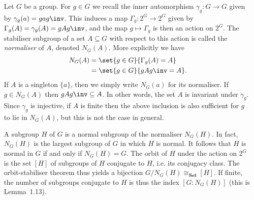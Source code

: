 \documentclass[article, a4paper, 11pt, oneside]{memoir}
\numberwithin{equation}{chapter}
\newcommand{\ncat}[1]{\mathbf{#1}} %
\newcommand{\catSet}{\ncat{Set}} %
\theoremstyle{nonumberplain}
\begin{document}
\begin{remarkbreak}
    Let $G$ be a group. For $g \in G$ we recall the inner automorphism $\gamma_g \colon G \to G$ given by $\gamma_g(a) = gag\inv$. This induces a map $\Gamma_g \colon 2^G \to 2^G$ given by $\Gamma_g(A) = \gamma_g(A) = gAg\inv$, and the map $g \mapsto \Gamma_g$ is then an action on $2^G$. The stabiliser subgroup of a set $A \subseteq G$ with respect to this action is called the \emph{normaliser} of $A$, denoted $N_G(A)$. More explicitly we have
    \begin{align*}
        N_G(A)
            &= \set{g \in G}{\Gamma_g(A) = A} \\
            &= \set{g \in G}{gAg\inv = A}.
    \end{align*}
    If $A$ is a singleton $\{a\}$, then we simply write $N_G(a)$ for its normaliser. If $g \in N_G(A)$ then $gAg\inv \subseteq A$. In other words, the set $A$ is invariant under $\gamma_g$. Since $\gamma_g$ is injective, if $A$ is finite then the above inclusion is also sufficient for $g$ to lie in $N_G(A)$, but this is not the case in general.

    A subgroup $H$ of $G$ is a normal subgroup of the normaliser $N_G(H)$. In fact, $N_G(H)$ is the largest subgroup of $G$ in which $H$ is normal. It follows that $H$ is normal in $G$ if and only if $N_G(H) = G$. The orbit of $H$ under the action on $2^G$ is the set $[H]$ of subgroups of $H$ conjugate to $H$, i.e. its conjugacy class. The orbit-stabiliser theorem thus yields a bijection $G/N_G(H) \cong_\catSet [H]$. If finite, the number of subgroups conjugate to $H$ is thus the index $[G : N_G(H)]$ (this is Lemma~1.13).


\end{remarkbreak}
\end{document}
